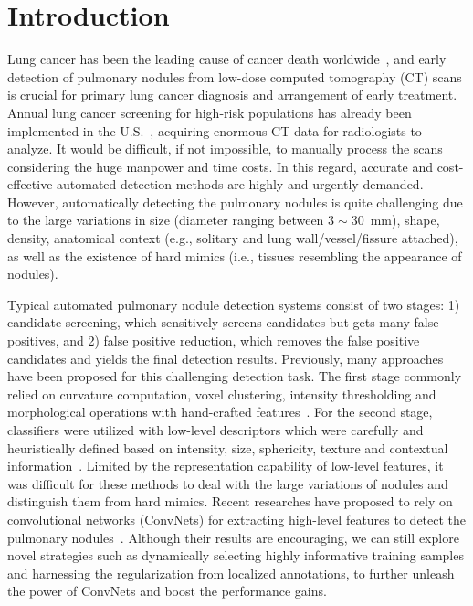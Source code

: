 \documentclass{llncs}
\begin{document}
\section{Introduction}
Lung cancer has been the leading cause of cancer death worldwide~\cite{setio2016validation}, and early detection of pulmonary nodules from low-dose computed tomography (CT) scans is crucial for primary lung cancer diagnosis and arrangement of early treatment.
Annual lung cancer screening for high-risk populations has already been implemented in the U.S.~\cite{national2011reduced}, acquiring enormous CT data for radiologists to analyze.
It would be difficult, if not impossible, to manually process the scans considering the huge manpower and time costs.
In this regard, accurate and cost-effective automated detection methods are highly and urgently demanded.
However, automatically detecting the pulmonary nodules is quite challenging due to the large variations in size (diameter ranging between $3\!\sim\!30$~mm), shape, density, anatomical context (e.g., solitary and lung wall/vessel/fissure attached), as well as the existence of hard mimics (i.e., tissues resembling the appearance of nodules).

Typical automated pulmonary nodule detection systems consist of two stages: 1) candidate screening, which sensitively screens candidates but gets many false positives, and 2) false positive reduction, which removes the false positive candidates and yields the final detection results.
Previously, many approaches have been proposed for this challenging detection task.
The first stage commonly relied on curvature computation, voxel clustering, intensity thresholding and morphological operations with hand-crafted features~\cite{jacobs2014automatic,murphy2009large}.
For the second stage, classifiers were utilized with low-level descriptors which were carefully and heuristically defined based on intensity, size, sphericity, texture and contextual information~\cite{jacobs2014automatic,murphy2009large,van2010comparing}.
Limited by the representation capability of low-level features,
it was difficult for these methods to deal with the large variations of nodules and distinguish them from hard mimics. 
Recent researches have proposed to rely on convolutional networks (ConvNets) for extracting high-level features to detect the pulmonary nodules~\cite{setio2016pulmonary,setio2016validation}.
Although their results are encouraging, we can still explore novel strategies such as dynamically selecting highly informative training samples and harnessing the regularization from localized annotations, to further unleash the power of ConvNets and boost the performance gains.
\end{document}
